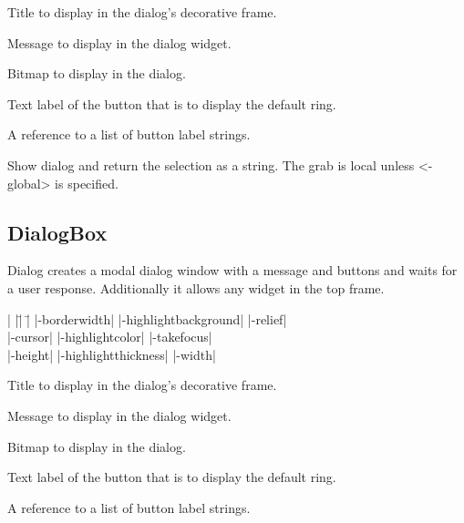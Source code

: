 \vskip5pt
\begin{enum}{1cm}

 Title to display in the dialog's decorative frame.

 Message to display in the dialog widget.

 Bitmap to display in the dialog.

 Text label of the button that is to display the
default ring.

 A reference to a list of button label strings.

\end{enum}

\vskip5pt

\begin{enum}{1cm}

 Show dialog and return the
selection as a string.  The grab is local unless <-global> is specified.

\end{enum}

\subsection*{DialogBox}
Dialog creates a modal dialog window with a message and buttons and waits
for a user response.  Additionally it allows any widget in the top frame.
\vskip5pt
\vspace{-4pt}

\begin{tabbing}
|                   |\=|                     |\= \kill
|-borderwidth| \> |-highlightbackground|     \> |-relief| \\   
|-cursor|      \> |-highlightcolor|          \> |-takefocus| \\
|-height|      \> |-highlightthickness|      \> |-width| \\
\end{tabbing}

\vskip5pt
\begin{enum}{1cm}

 Title to display in the dialog's decorative frame.

 Message to display in the dialog widget.

 Bitmap to display in the dialog.

 Text label of the button that is to display the
default ring.

 A reference to a list of button label strings.

\end{enum}

